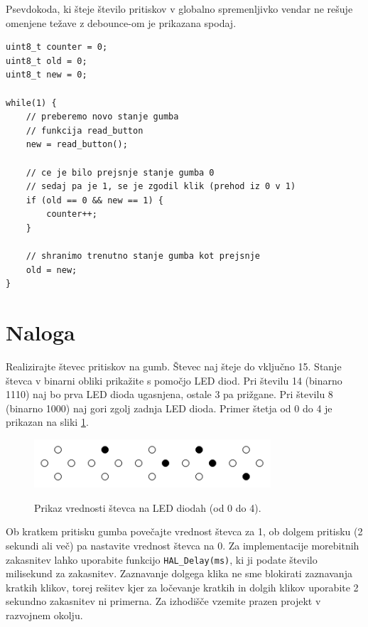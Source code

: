 \documentclass[12pt,letterpaper]{article}
\begin{document}
Psevdokoda, ki šteje število pritiskov v globalno spremenljivko vendar ne rešuje omenjene težave z debounce-om je prikazana spodaj.

\begin{center}
\begin{lstlisting}[style=CStyle]
uint8_t counter = 0;
uint8_t old = 0;
uint8_t new = 0;

while(1) {
    // preberemo novo stanje gumba
    // funkcija read_button
    new = read_button();
    
    // ce je bilo prejsnje stanje gumba 0
    // sedaj pa je 1, se je zgodil klik (prehod iz 0 v 1)
    if (old == 0 && new == 1) {
        counter++;
    }
    
    // shranimo trenutno stanje gumba kot prejsnje
    old = new;
}
\end{lstlisting}
\end{center}

\newpage


\section*{Naloga}

Realizirajte števec pritiskov na gumb. Števec naj šteje do vključno 15. Stanje števca v binarni obliki prikažite s pomočjo LED diod. Pri številu 14 (binarno 1110) naj bo prva LED dioda ugasnjena, ostale 3 pa prižgane. Pri številu 8 (binarno 1000) naj gori zgolj zadnja LED dioda. Primer štetja od 0 do 4 je prikazan na sliki \ref{LedStevec}.

\begin{figure}[ht!]
  \centering
  \caption{Prikaz vrednosti števca na LED diodah (od 0 do 4).}
  \includegraphics[width=250pt]{images/vaja4/ledstevec.png}
  \label{LedStevec}
\end{figure}

Ob kratkem pritisku gumba povečajte vrednost števca za 1, ob dolgem pritisku (2 sekundi ali več) pa nastavite vrednost števca na 0. Za implementacije morebitnih zakasnitev lahko uporabite funkcijo \texttt{HAL\_Delay(ms)}, ki ji podate število milisekund za zakasnitev. Zaznavanje dolgega klika ne sme blokirati zaznavanja kratkih klikov, torej rešitev kjer za ločevanje kratkih in dolgih klikov uporabite 2 sekundno zakasnitev ni primerna. Za izhodišče vzemite prazen projekt v razvojnem okolju.
\end{document}
